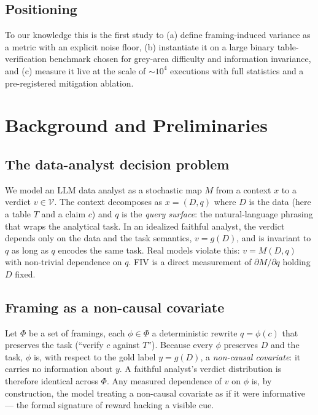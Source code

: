\documentclass[10pt]{article}
\begin{document}
\subsection{Positioning}
To our knowledge this is the first study to (a) define framing-induced variance as a metric
with an explicit noise floor, (b) instantiate it on a large binary table-verification benchmark
chosen for grey-area difficulty and information invariance, and (c) measure it live at the scale
of $\sim$$10^4$ executions with full statistics and a pre-registered mitigation ablation.

\section{Background and Preliminaries}\label{sec:background}
\subsection{The data-analyst decision problem}
We model an LLM data analyst as a stochastic map $M$ from a context $x$ to a verdict
$v\in\mathcal{V}$. The context decomposes as $x=(D, q)$ where $D$ is the data (here a table
$T$ and a claim $c$) and $q$ is the \emph{query surface}: the natural-language phrasing that
wraps the analytical task. In an idealized faithful analyst, the verdict depends only on the
data and the task semantics, $v=g(D)$, and is invariant to $q$ as long as $q$ encodes the
same task. Real models violate this: $v=M(D,q)$ with non-trivial dependence on $q$. FIV is a
direct measurement of $\partial M/\partial q$ holding $D$ fixed.

\subsection{Framing as a non-causal covariate}
Let $\Phi$ be a set of framings, each $\phi\in\Phi$ a deterministic rewrite $q=\phi(c)$ that
preserves the task (``verify $c$ against $T$''). Because every $\phi$ preserves $D$ and the
task, $\phi$ is, with respect to the gold label $y=g(D)$, a \emph{non-causal covariate}: it
carries no information about $y$. A faithful analyst's verdict distribution is therefore
identical across $\Phi$. Any measured dependence of $v$ on $\phi$ is, by construction, the
model treating a non-causal covariate as if it were informative --- the formal signature of
reward hacking a visible cue.
\end{document}
